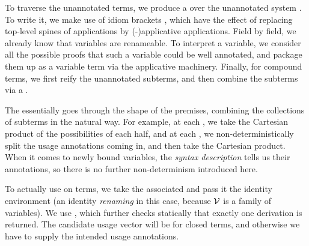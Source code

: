 
To traverse the unannotated terms, we produce a  over the
unannotated system \AgdaSpace{}.
To write it, we make use of idiom brackets
\AgdaSymbol{\ensuremath{\llparenthesis}}\AgdaSpace{}\AgdaSymbol{$\ldots$}\AgdaSpace{}\AgdaSymbol{\ensuremath{\rrparenthesis}},
which have the effect of replacing top-level spines of applications by
(-)applicative applications.
Field by field, we already know that variables are renameable.
To interpret a variable, we consider all the possible proofs that such a
variable could be well annotated, and package them up as a variable term via
the applicative machinery.
Finally, for compound terms, we first reify the unannotated subterms, and then
combine the subterms via a .


The  essentially goes through the shape of the premises,
combining the collections of subterms in the natural way.
For example, at each
\AgdaInductiveConstructor{\AgdaUnderscore{}$\dottimes$\AgdaUnderscore{}},
we take the Cartesian product of the possibilities of each half, and at each
\AgdaInductiveConstructor{\AgdaUnderscore{}$\sep$\AgdaUnderscore{}},
we non-deterministically split the usage annotations coming in, and then take
the Cartesian product.
When it comes to newly bound variables, the \emph{syntax description} tells us
their annotations, so there is no further non-determinism introduced here.


To actually use  on terms, we take the associated
 and pass it the identity environment (an identity
\emph{renaming} in this case, because $\mathcal V$ is a family of variables).
We use , which further
checks statically that exactly one derivation is returned.
The candidate usage vector  will be \AgdaFunction{[]} for closed
terms, and otherwise we have to supply the intended usage annotations.

